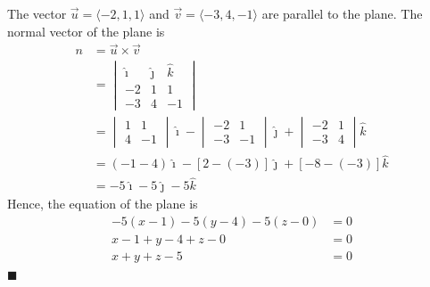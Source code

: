 \begin{enumerate}
          \sol{} The vector $\vec{u} = \langle -2, 1, 1 \rangle$ and $\vec{v} = \langle -3, 4, -1 \rangle$ are parallel to the plane. The normal vector of the plane is
          \begin{align*}
              n & = \vec{u} \times \vec{v}                                                       \\
                & = \begin{vmatrix}
                        \hat{\imath} & \hat{\jmath} & \hat{k} \\
                        -2           & 1            & 1       \\
                        -3           & 4            & -1
                    \end{vmatrix}                    \\
                & = \begin{vmatrix}
                        1 & 1  \\
                        4 & -1
                    \end{vmatrix}\hat{\imath} - \begin{vmatrix}
                                                    -2 & 1  \\
                                                    -3 & -1
                                                \end{vmatrix}\hat{\jmath} + \begin{vmatrix}
                                                                                -2 & 1 \\
                                                                                -3 & 4
                                                                            \end{vmatrix}\hat{k} \\
                & = (-1-4)\hat{\imath} - [2-(-3)]\hat{\jmath} + [-8-(-3)]\hat{k}                 \\
                & = -5\hat{\imath} - 5\hat{\jmath} - 5\hat{k}
          \end{align*}
          Hence, the equation of the plane is
          \begin{align*}
              -5(x - 1) - 5(y - 4) - 5(z - 0) & = 0 \\
              x - 1 + y - 4 + z - 0           & = 0 \\
              x + y + z - 5                   & = 0
          \end{align*} \hfill $\blacksquare$

\end{enumerate}
